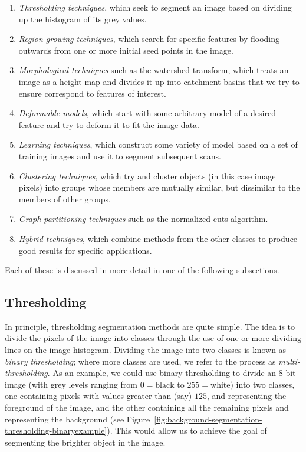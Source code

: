 \begin{enumerate}

\item \emph{Thresholding techniques}, which seek to segment an image based on dividing up the histogram of its grey values.
\item \emph{Region growing techniques}, which search for specific features by flooding outwards from one or more initial seed points in the image.
\item \emph{Morphological techniques} such as the watershed transform, which treats an image as a height map and divides it up into catchment basins that we try to ensure correspond to features of interest.
\item \emph{Deformable models}, which start with some arbitrary model of a desired feature and try to deform it to fit the image data.
\item \emph{Learning techniques}, which construct some variety of model based on a set of training images and use it to segment subsequent scans.
\item \emph{Clustering techniques}, which try and cluster objects (in this case image pixels) into groups whose members are mutually similar, but dissimilar to the members of other groups.
\item \emph{Graph partitioning techniques} such as the normalized cuts algorithm.
\item \emph{Hybrid techniques}, which combine methods from the other classes to produce good results for specific applications.

\end{enumerate}

\noindent Each of these is discussed in more detail in one of the following subsections.

\subsection{Thresholding}


In principle, thresholding segmentation methods are quite simple. The idea is to divide the pixels of the image into classes through the use of one or more dividing lines on the image histogram. Dividing the image into two classes is known as \emph{binary thresholding}; where more classes are used, we refer to the process as \emph{multi-thresholding}. As an example, we could use binary thresholding to divide an 8-bit image (with grey levels ranging from $0 = \mbox{black}$ to $255 = \mbox{white}$) into two classes, one containing pixels with values greater than (say) $125$, and representing the foreground of the image, and the other containing all the remaining pixels and representing the background (see Figure~\ref{fig:background-segmentation-thresholding-binaryexample}). This would allow us to achieve the goal of segmenting the brighter object in the image.

